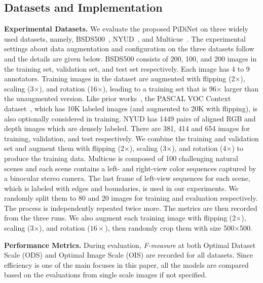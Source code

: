 \documentclass[10pt,twocolumn,letterpaper]{article}
\begin{document}
\subsection{Datasets and Implementation}
\noindent \textbf{Experimental Datasets.} \quad We evaluate the proposed PiDiNet on three widely used datasets, namely, BSDS500~\cite{arbelaez2010bsds}, NYUD~\cite{shi2000nyud}, and Multicue~\cite{mely2016multicue}. The experimental settings about data augmentation and configuration on the three datasets follow~\cite{xie2017holistically,liu2019richer,he2019bidirectional} and the details are given below. BSDS500 consists of 200, 100, and 200 images in the training set, validation set, and test set respectively. Each image has 4 to 9 annotators. Training images in the dataset are augmented with flipping (2$\times$), scaling (3$\times$), and rotation (16$\times$), leading to a training set that is 96$\times$ larger than the unaugmented version. Like prior works~\cite{xie2017holistically,liu2019richer,he2019bidirectional}, the PASCAL VOC Context dataset~\cite{mottaghi2014voc}, which has 10K labeled images (and augmented to 20K with flipping), is also optionally considered in training. NYUD has 1449 pairs of aligned RGB and depth images which are densely labeled. There are 381, 414 and 654 images for training, validation, and test respectively. We combine the training and validation set and augment them with flipping (2$\times$), scaling (3$\times$), and rotation (4$\times$) to produce the training data. Multicue is composed of 100 challenging natural scenes and each scene contains a left- and right-view color sequences captured by a binocular stereo camera. The last frame of left-view sequences for each scene, which is labeled with edges and boundaries, is used in our experiments. We randomly split them to 80 and 20 images for training and evaluation respectively. The process is independently repeated twice more. The metrics are then recorded from the three runs. We also augment each training image with flipping (2$\times$), scaling (3$\times$), and rotation ($16\times$), then randomly crop them with size 500$\times$500. 


\vspace{0.3em}
\noindent \textbf{Performance Metrics.} \quad During evaluation, \emph{F-measure} at both Optimal Dataset Scale (ODS) and Optimal Image Scale (OIS) are recorded for all datasets. Since efficiency is one of the main focuses in this paper, all the models are compared based on the evaluations from single scale images if not specified.
\end{document}
